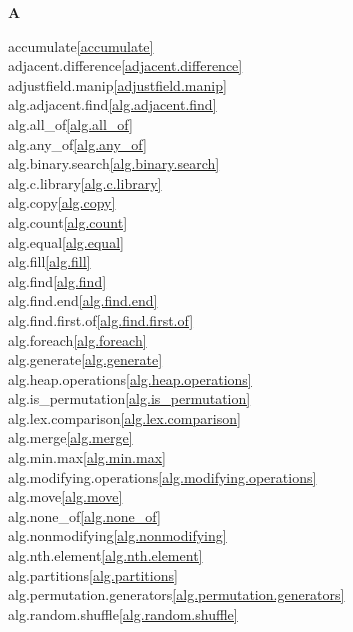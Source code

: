 \begin{multicols}{2}


\par \textbf{A}\par
accumulate\quad\ref{accumulate}\\
adjacent.difference\quad\ref{adjacent.difference}\\
adjustfield.manip\quad\ref{adjustfield.manip}\\
alg.adjacent.find\quad\ref{alg.adjacent.find}\\
alg.all_of\quad\ref{alg.all_of}\\
alg.any_of\quad\ref{alg.any_of}\\
alg.binary.search\quad\ref{alg.binary.search}\\
alg.c.library\quad\ref{alg.c.library}\\
alg.copy\quad\ref{alg.copy}\\
alg.count\quad\ref{alg.count}\\
alg.equal\quad\ref{alg.equal}\\
alg.fill\quad\ref{alg.fill}\\
alg.find\quad\ref{alg.find}\\
alg.find.end\quad\ref{alg.find.end}\\
alg.find.first.of\quad\ref{alg.find.first.of}\\
alg.foreach\quad\ref{alg.foreach}\\
alg.generate\quad\ref{alg.generate}\\
alg.heap.operations\quad\ref{alg.heap.operations}\\
alg.is_permutation\quad\ref{alg.is_permutation}\\
alg.lex.comparison\quad\ref{alg.lex.comparison}\\
alg.merge\quad\ref{alg.merge}\\
alg.min.max\quad\ref{alg.min.max}\\
alg.modifying.operations\quad\ref{alg.modifying.operations}\\
alg.move\quad\ref{alg.move}\\
alg.none_of\quad\ref{alg.none_of}\\
alg.nonmodifying\quad\ref{alg.nonmodifying}\\
alg.nth.element\quad\ref{alg.nth.element}\\
alg.partitions\quad\ref{alg.partitions}\\
alg.permutation.generators\quad\ref{alg.permutation.generators}\\
alg.random.shuffle\quad\ref{alg.random.shuffle}\\

\end{multicols}
